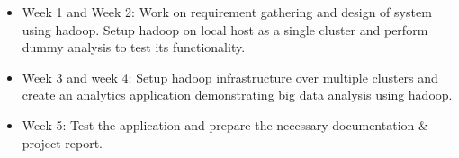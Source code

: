\begin{itemize}
	\item Week 1 and Week 2: Work on requirement gathering and design of system using hadoop. Setup hadoop on local host as a single cluster and perform dummy analysis to test its functionality.
	\item Week 3 and week 4: Setup hadoop infrastructure over multiple clusters and create an analytics application demonstrating big data analysis using hadoop.
	\item Week 5: Test the application and prepare the necessary documentation & project report.
\end{itemize}

